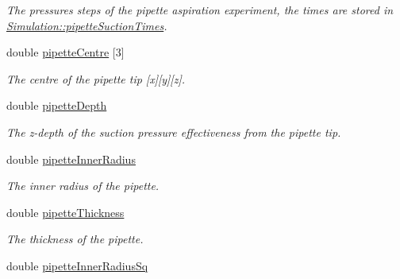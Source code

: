 \begin{DoxyCompactItemize}
\begin{DoxyCompactList}\small\item\em The pressures steps of the pipette aspiration experiment, the times are stored in \hyperlink{classSimulation_ae9b603670a57de082f3c87615eed3822}{Simulation\+::pipette\+Suction\+Times}. \end{DoxyCompactList}\item 
\hypertarget{classSimulation_a80ba175cfd0377ddab49a0058139f03c}{}double \hyperlink{classSimulation_a80ba175cfd0377ddab49a0058139f03c}{pipette\+Centre} \mbox{[}3\mbox{]}\label{classSimulation_a80ba175cfd0377ddab49a0058139f03c}

\begin{DoxyCompactList}\small\item\em The centre of the pipette tip \mbox{[}x\mbox{]}\mbox{[}y\mbox{]}\mbox{[}z\mbox{]}. \end{DoxyCompactList}\item 
\hypertarget{classSimulation_a6d987f6569d306688d272436294e85f4}{}double \hyperlink{classSimulation_a6d987f6569d306688d272436294e85f4}{pipette\+Depth}\label{classSimulation_a6d987f6569d306688d272436294e85f4}

\begin{DoxyCompactList}\small\item\em The z-\/depth of the suction pressure effectiveness from the pipette tip. \end{DoxyCompactList}\item 
\hypertarget{classSimulation_a9c0a8edcc987294ad36dc43cb0b2c77c}{}double \hyperlink{classSimulation_a9c0a8edcc987294ad36dc43cb0b2c77c}{pipette\+Inner\+Radius}\label{classSimulation_a9c0a8edcc987294ad36dc43cb0b2c77c}

\begin{DoxyCompactList}\small\item\em The inner radius of the pipette. \end{DoxyCompactList}\item 
\hypertarget{classSimulation_a330bde4b57359e57318c1105edde06c5}{}double \hyperlink{classSimulation_a330bde4b57359e57318c1105edde06c5}{pipette\+Thickness}\label{classSimulation_a330bde4b57359e57318c1105edde06c5}

\begin{DoxyCompactList}\small\item\em The thickness of the pipette. \end{DoxyCompactList}\item 
\hypertarget{classSimulation_ab7a32b7ebb6db0157237249733ee653f}{}double \hyperlink{classSimulation_ab7a32b7ebb6db0157237249733ee653f}{pipette\+Inner\+Radius\+Sq}\label{classSimulation_ab7a32b7ebb6db0157237249733ee653f}


\end{DoxyCompactItemize}
